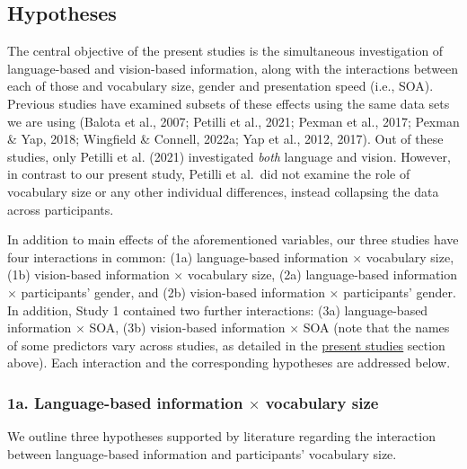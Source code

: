 \documentclass[
  12pt,
  man,floatsintext]{apa7}
\begin{document}
\hypertarget{hypotheses}{%
\subsection{Hypotheses}\label{hypotheses}}

The central objective of the present studies is the simultaneous investigation of language-based and vision-based information, along with the interactions between each of those and vocabulary size, gender and presentation speed (i.e., SOA). Previous studies have examined subsets of these effects using the same data sets we are using (Balota et al., 2007; Petilli et al., 2021; Pexman et al., 2017; Pexman \& Yap, 2018; Wingfield \& Connell, 2022a; Yap et al., 2012, 2017). Out of these studies, only Petilli et al. (2021) investigated \emph{both} language and vision. However, in contrast to our present study, Petilli et al.~did not examine the role of vocabulary size or any other individual differences, instead collapsing the data across participants.

In addition to main effects of the aforementioned variables, our three studies have four interactions in common: (1a) language-based information \(\times\) vocabulary size, (1b) vision-based information \(\times\) vocabulary size, (2a) language-based information \(\times\) participants' gender, and (2b) vision-based information \(\times\) participants' gender. In addition, Study 1 contained two further interactions: (3a) language-based information \(\times\) SOA, (3b) vision-based information \(\times\) SOA (note that the names of some predictors vary across studies, as detailed in the \protect\hyperlink{language}{\underline{present studies}} section above). Each interaction and the corresponding hypotheses are addressed below.

\hypertarget{a.-language-based-information-times-vocabulary-size}{%
\subsubsection{\texorpdfstring{1a. Language-based information \(\times\) vocabulary size}{1a. Language-based information \textbackslash times vocabulary size}}\label{a.-language-based-information-times-vocabulary-size}}

We outline three hypotheses supported by literature regarding the interaction between language-based information and participants' vocabulary size.
\end{document}
